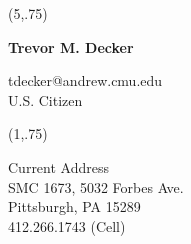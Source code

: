 \documentclass[]{article}
\begin{document}
\addtolength{\topmargin}{1in}
\pagestyle{empty} %
\noindent



\begin{textblock}{6}(5,.75)
\begin{center}
\begin{Huge}
\bf
Trevor M. Decker\\
\end{Huge}
tdecker@andrew.cmu.edu \\
U.S. Citizen
\end{center}
\end{textblock}


\begin{textblock}{3}(1,.75)
\begin{center}
\scriptsize
Current Address\\
SMC 1673, 5032 Forbes Ave.\\
Pittsburgh, PA 15289\\
412.266.1743 (Cell)\\
\end{center}
\end{textblock}
\end{document}
